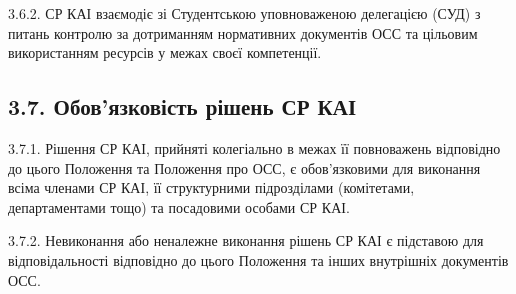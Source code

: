     3.6.2. СР КАІ взаємодіє зі Студентською уповноваженою делегацією (СУД) з питань контролю за дотриманням нормативних документів ОСС та цільовим використанням ресурсів у межах своєї компетенції.

\subsection*{3.7. Обов'язковість рішень СР КАІ}
    3.7.1. Рішення СР КАІ, прийняті колегіально в межах її повноважень відповідно до цього Положення та Положення про ОСС, є обов'язковими для виконання всіма членами СР КАІ, її структурними підрозділами (комітетами, департаментами тощо) та посадовими особами СР КАІ.

    3.7.2. Невиконання або неналежне виконання рішень СР КАІ є підставою для відповідальності відповідно до цього Положення та інших внутрішніх документів ОСС. 